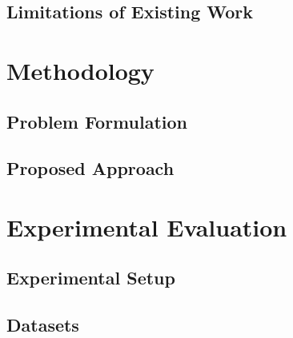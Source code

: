 \documentclass[11pt,a4paper]{article}
\begin{document}
\subsection{Limitations of Existing Work}
\label{subsec:limitations}


\section{Methodology}
\label{sec:methodology}


\subsection{Problem Formulation}
\label{subsec:formulation}


\subsection{Proposed Approach}
\label{subsec:approach}


\section{Experimental Evaluation}
\label{sec:experiments}


\subsection{Experimental Setup}
\label{subsec:setup}


\subsection{Datasets}
\label{subsec:datasets}
\end{document}
